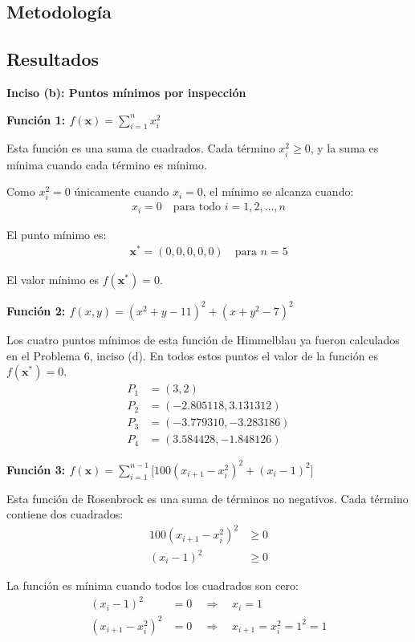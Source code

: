 \documentclass{article}
\begin{document}
\subsection{Metodología}

\subsection{Resultados}
\setcounter{equation}{0}

\textbf{Inciso (b): Puntos mínimos por inspección}

\textbf{Función 1: $f(\mathbf{x}) = \sum_{i=1}^{n} x_i^{2}$}

Esta función es una suma de cuadrados. Cada término $x_i^2 \geq 0$, y la suma es mínima cuando cada término es mínimo.

Como $x_i^2 = 0$ únicamente cuando $x_i = 0$, el mínimo se alcanza cuando:
\begin{align}
x_i = 0 \quad \text{para todo } i = 1, 2, \ldots, n
\end{align}

El punto mínimo es:
\begin{align}
\mathbf{x}^* = (0, 0, 0, 0, 0) \quad \text{para } n = 5
\end{align}

El valor mínimo es $f(\mathbf{x}^*) = 0$.

\textbf{Función 2: $f(x,y) = (x^{2}+y-11)^{2} + (x+y^{2}-7)^{2}$}

Los cuatro puntos mínimos de esta función de Himmelblau ya fueron calculados en el Problema 6, inciso (d). En todos estos puntos el valor de la función es $f(\mathbf{x}^*) = 0$.
\begin{align}
P_1 &= (3, 2) \\
P_2 &= (-2.805118, 3.131312) \\
P_3 &= (-3.779310, -3.283186) \\
P_4 &= (3.584428, -1.848126)
\end{align}

\textbf{Función 3: $f(\mathbf{x}) = \sum_{i=1}^{n-1} \bigl[100(x_{i+1}-x_i^{2})^{2} + (x_i-1)^{2}\bigr]$}

Esta función de Rosenbrock es una suma de términos no negativos. Cada término contiene dos cuadrados:
\begin{align}
100(x_{i+1} - x_i^2)^2 &\geq 0 \\
(x_i - 1)^2 &\geq 0
\end{align}

La función es mínima cuando todos los cuadrados son cero:
\begin{align}
(x_i - 1)^2 &= 0 \quad \Rightarrow \quad x_i = 1 \\
(x_{i+1} - x_i^2)^2 &= 0 \quad \Rightarrow \quad x_{i+1} = x_i^2 = 1^2 = 1
\end{align}
\end{document}

